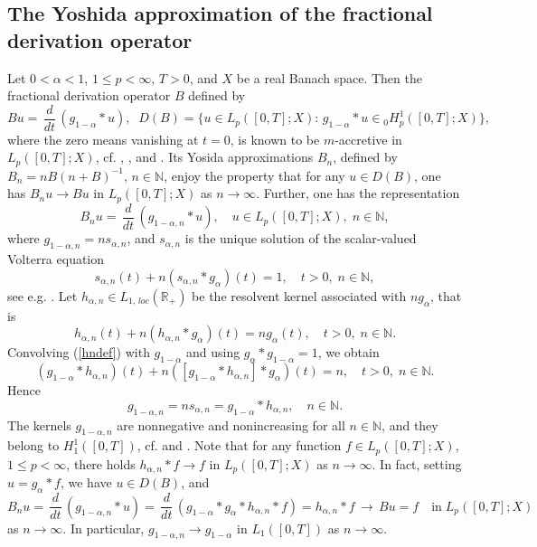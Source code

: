 \documentclass[10pt]{article}
\newcommand{\iR}{\mathbb{R}}
\newcommand{\iN}{\mathbb{N}}
\begin{document}
\subsection{The Yoshida approximation of the fractional
derivation operator} \label{SecYos}
Let $0<\alpha<1$, $1\le p<\infty$, $T>0$, and $X$ be a real Banach
space. Then the fractional derivation operator $B$ defined by
\[ B u=\,\frac{d}{dt}\,(g_{1-\alpha}\ast u),\;\;D(B)=\{u\in L_p([0,T];X):\,g_{1-\alpha}\ast u\in \mbox{}_0 H^1_p([0,T];X)\},
\]
where the zero means vanishing at $t=0$, is known to be
$m$-accretive in $L_p([0,T];X)$, cf. \cite{Phil1}, \cite{CP}, and
\cite{Grip1}. Its Yosida approximations $B_{n}$, defined by
$B_{n}=nB(n+B)^{-1},\,n\in \iN$, enjoy the property that for any
$u\in D(B)$, one has $B_{n}u\rightarrow Bu$ in $L_p([0,T];X)$ as
$n\to \infty$. Further, one has the representation
\begin{equation} \label{Yos}
B_n u=\,\frac{d}{dt}\,(g_{1-\alpha,n}\ast u),\quad u\in
L_p([0,T];X),\;n\in \iN,
\end{equation}
where $g_{1-\alpha,n}=n s_{\alpha,n}$, and $s_{\alpha,n}$ is the
unique solution of the scalar-valued Volterra equation
\[
s_{\alpha,n}(t)+n(s_{\alpha,n}\ast g_\alpha)(t)=1,\quad
t>0,\;n\in\iN,
\]
see e.g. \cite{VZ}. Let $h_{\alpha,n}\in L_{1,\,loc}(\iR_+)$ be the
resolvent kernel associated with $ng_\alpha$, that is
\begin{equation} \label{hndef}
h_{\alpha,n}(t)+n(h_{\alpha,n}\ast g_\alpha)(t)=ng_\alpha(t),\quad
t>0,\;n\in\iN.
\end{equation}
Convolving (\ref{hndef}) with $g_{1-\alpha}$ and using $g_\alpha\ast
g_{1-\alpha}=1$, we obtain
\[
(g_{1-\alpha}\ast h_{\alpha,n})(t)+n([g_{1-\alpha}\ast
h_{\alpha,n}]\ast g_\alpha)(t)=n,\quad t>0,\;n\in\iN.
\]
Hence
\begin{equation} \label{gnprop}
g_{1-\alpha,n}=ns_{\alpha,n}=g_{1-\alpha}\ast h_{\alpha,n},\quad
n\in \iN.
\end{equation}
The kernels $g_{1-\alpha,n}$ are nonnegative and nonincreasing for
all $n\in\iN$, and they belong to $H^1_1([0,T])$, cf. \cite{JanI}
and \cite{VZ}. Note that for any function $f\in L_p([0,T];X)$, $1\le
p<\infty$, there holds $h_{\alpha,n}\ast f\to f$ in $L_p([0,T];X)$
as $n\to \infty$. In fact, setting $u=g_\alpha\ast f$, we have $u\in
D(B)$, and
\[
B_n u=\,\frac{d}{dt}\,(g_{1-\alpha,n}\ast
u)=\,\frac{d}{dt}\,(g_{1-\alpha}\ast g_\alpha\ast h_{\alpha,n}\ast
f)=h_{\alpha,n}\ast f\,\to\,Bu=f\quad\mbox{in}\;L_p([0,T];X)
\]
as $n\to \infty$. In particular, $g_{1-\alpha,n}\to g_{1-\alpha}$ in
$L_1([0,T])$ as $n\to \infty$.
\end{document}
